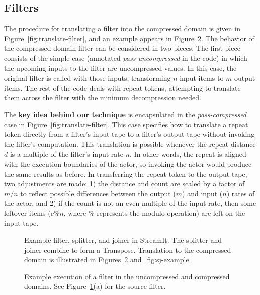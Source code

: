 \subsection*{Filters}

The procedure for translating a filter into the compressed domain is
given in Figure~\ref{fig:translate-filter}, and an example appears in
Figure~\ref{fig:filter-example}.  The behavior of the
compressed-domain filter can be considered in two pieces.  The first
piece consists of the simple case (annotated {\it pass-uncompressed}
in the code) in which the upcoming inputs to the filter are
uncompressed values.  In this case, the original filter is called with
those inputs, transforming $n$ input items to $m$ output items.  The
rest of the code deals with repeat tokens, attempting to translate
them across the filter with the minimum decompression needed.

The {\bf key idea behind our technique} is encapsulated in the {\it
  pass-compressed} case in Figure~\ref{fig:translate-filter}.  This
case specifies how to translate a repeat token directly from a
filter's input tape to a filter's output tape without invoking the
filter's computation.  This translation is possible whenever the
repeat distance $d$ is a multiple of the filter's input rate $n$.  In
other words, the repeat is aligned with the execution boundaries of
the actor, so invoking the actor would produce the same results as
before.  In transferring the repeat token to the output tape, two
adjustments are made: 1) the distance and count are scaled by a factor
of $m/n$ to reflect possible differences between the output ($m$) and
input ($n$) rates of the actor, and 2) if the count is not an even
multiple of the input rate, then some leftover items ($c\%n$, where
$\%$ represents the modulo operation) are left on the input tape.

\begin{figure}[t!]
\caption[Example StreamIt code to be mapped into the compressed
  domain]{Example filter, splitter, and joiner in StreamIt.  The
  splitter and joiner combine to form a Transpose. Translation to the
  compressed domain is illustrated in Figures~\ref{fig:filter-example}
  and~\ref{fig:sj-example}.\protect\label{fig:streamit-example}}
\end{figure}

\begin{figure}[t!]
\vspace{-18pt}
\vspace{-30pt} %
\caption[Example execution of a filter in the uncompressed and
  compressed domains]{Example execution of a filter in the
  uncompressed and compressed domains.  See
  Figure~\ref{fig:streamit-example}(a) for the source
  filter.\protect\label{fig:filter-example}}
\vspace{12pt}
\end{figure}

